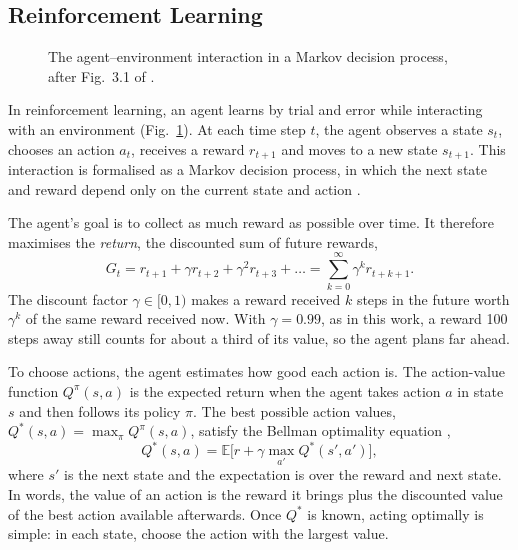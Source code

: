 \documentclass[conference,a4paper]{IEEEtran}
\begin{document}
\subsection{Reinforcement Learning}
\begin{figure}[t]
\centering
{}
\caption{The agent--environment interaction in a Markov decision process, after Fig.~3.1 of
\citet{sutton2018reinforcement}.}
\label{fig:agent_env}
\end{figure}

In reinforcement learning, an agent learns by trial and error while interacting with an environment
(Fig.~\ref{fig:agent_env}). At each time step $t$, the agent observes a state $s_t$, chooses an action $a_t$, receives
a reward $r_{t+1}$ and moves to a new state $s_{t+1}$. This interaction is formalised as a Markov decision process, in
which the next state and reward depend only on the current state and action \citep{sutton2018reinforcement}.

The agent's goal is to collect as much reward as possible over time. It therefore maximises the \emph{return},
the discounted sum of future rewards,
\begin{equation}
G_t=r_{t+1}+\gamma r_{t+2}+\gamma^2 r_{t+3}+\dots=\sum_{k=0}^{\infty}\gamma^k r_{t+k+1}.
\end{equation}
The discount factor $\gamma\in[0,1)$ makes a reward received $k$ steps in the future worth $\gamma^k$ of the same
reward received now. With $\gamma=0.99$, as in this work, a reward 100 steps away still counts for about a third of
its value, so the agent plans far ahead.

To choose actions, the agent estimates how good each action is. The action-value function $Q^{\pi}(s,a)$ is the
expected return when the agent takes action $a$ in state $s$ and then follows its policy $\pi$. The best possible
action values, $Q^*(s,a)=\max_\pi Q^{\pi}(s,a)$, satisfy the Bellman optimality equation
\citep{sutton2018reinforcement},
\begin{equation}
Q^*(s,a)=\mathbb{E}\Big[r+\gamma\max_{a'}Q^*(s',a')\Big],
\label{eq:bellman}
\end{equation}
where $s'$ is the next state and the expectation is over the reward and next state. In words, the value of an action
is the reward it brings plus the discounted value of the best action available afterwards. Once $Q^*$ is known, acting
optimally is simple: in each state, choose the action with the largest value.
\end{document}
